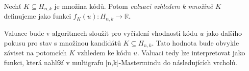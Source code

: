 










\begin{definice}[Valuace]
    Nechť $K \subseteq H_{n,k}$ je množina kódů. Potom \emph{valuaci vzhledem k množině $K$} definujeme jako funkci $f_K(u) \colon H_{n,k} \to \mathbb{R}$.
\end{definice}


Valuace bude v algoritmech sloužit pro vyčíslení vhodnosti kódu $u$ jako dalšího pokusu pro stav s množinou kandidátů $K\subseteq H_{n,k}$. Tato hodnota bude obvykle záviset na potomcích $K$ vzhledem ke kódu $u$. Valuaci tedy lze interpretovat jako funkci, která nahlíží v multigrafu [n,k]-Mastermindu do následujících vrcholů.

